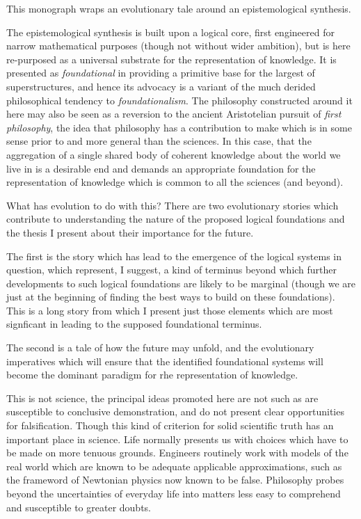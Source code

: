 This monograph wraps an evolutionary tale around an epistemological synthesis.

The epistemological synthesis is built upon a logical core, first engineered for narrow mathematical purposes (though not without wider ambition), but is here re-purposed as a universal substrate for the representation of knowledge.
It is presented as \emph{foundational} in providing a primitive base for the largest of superstructures, and hence its advocacy is a variant of the much derided philosophical tendency to \emph{foundationalism}.
The philosophy constructed around it here may also be seen as a reversion to the ancient Aristotelian pursuit of \emph{first philosophy}, the idea that philosophy has a contribution to make which is in some sense prior to and more general than the sciences.
In this case, that the aggregation of a single shared body of coherent knowledge about the world we live in is a desirable end and demands an appropriate foundation for the representation of knowledge which is common to all the sciences (and beyond).

What has evolution to do with this?
There are two evolutionary stories which contribute to understanding the nature of the proposed logical foundations and the thesis I present about their importance for the future.

The first is the story which has lead to the emergence of the logical systems in question, which represent, I suggest, a kind of terminus beyond which further developments to such logical foundations are likely to be marginal (though we are just at the beginning of finding the best ways to build on these foundations).
This is a long story from which I present just those elements which are most signficant in leading to the supposed foundational terminus.

The second is a tale of how the future may unfold, and the evolutionary imperatives which will ensure that the identified foundational systems will become the dominant paradigm for rhe representation of knowledge.

This is not science, the principal ideas promoted here are not such as are susceptible to conclusive demonstration, and do not present clear opportunities for falsification.
Though this kind of criterion for solid scientific truth has an important place in science.
Life normally presents us with choices which have to be made on more tenuous grounds.
Engineers routinely work with models of the real world which are known to be adequate applicable approximations, such as the frameword of Newtonian physics now known to be false.
Philosophy probes beyond the uncertainties of everyday life into matters less easy to comprehend and susceptible to greater doubts.

